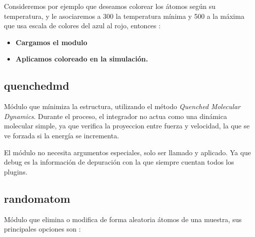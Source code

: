 Consideremos por ejemplo que deseamos colorear los \'atomos seg\'un su temperatura, y le asociaremos a 300 la temperatura m\'inima y 500 a la m\'axima que usa escala de colores del azul al rojo, entonces :

\begin{itemize}
 \item \textbf{Cargamos el modulo}
 \item \textbf{Aplicamos coloreado en la simulaci\'on.}
\end{itemize}

\subsection{quenchedmd}
M\'odulo que m\'inimiza la estructura, utilizando el m\'etodo \textit{Quenched Molecular Dynamics}. Durante el proceso, el integrador no actua como una din\'amica molecular simple, ya que verifica la proyeccion entre fuerza y velocidad, la que se ve forzada si la energ\'ia se incrementa.


El m\'odulo no necesita argumentos especiales, solo ser llamado y aplicado. Ya que debug es la informaci\'on de depuraci\'on con la que siempre cuentan todos los plugins.

\subsection{randomatom}
M\'odulo que elimina o modifica de forma aleatoria \'atomos de una muestra, sus principales opciones son : 


